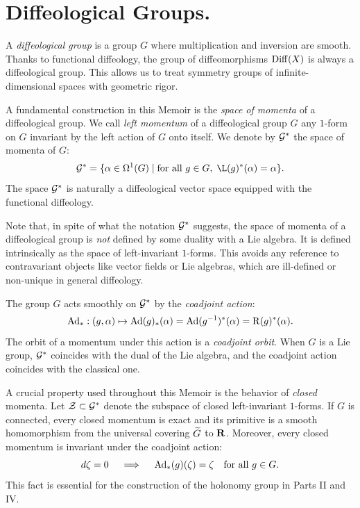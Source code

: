   \section{Diffeological Groups.}
  \label{sec:Diffeological Groups}
  
  A \emph{diffeological group} is a group $G$ where multiplication and inversion are smooth.
  Thanks to functional diffeology,
  the group of diffeomorphisms $\operatorname{Diff}(X)$ is always a diffeological group.
  This allows us to treat symmetry groups of infinite-dimensional spaces with geometric rigor.
  
  \begin{article}
    \label{subsec:Momenta}
    A fundamental construction in this Memoir is the \emph{space of momenta} of a diffeological group.
    We call \emph{left momentum} of a diffeological group $G$ any $1$-form on $G$ invariant by the left action of $G$ onto itself.
    We denote by $\mathcal{G}^*$ the space of momenta of $G$:
    \[
      \cG^* = \{ \alpha \in \DForms^1(G) \mid \text{for all } g \in G, \; \L(g)^*(\alpha) = \alpha \}.
      \]
    The space $\mathcal{G}^*$ is naturally a diffeological vector space equipped with the functional diffeology.
    
    Note that,
    in spite of what the notation $\mathcal{G}^*$ suggests,
    the space of momenta of a diffeological group is \emph{not} defined by some duality with a Lie algebra.
    It is defined intrinsically as the space of left-invariant $1$-forms.
    This avoids any reference to contravariant objects like vector fields or Lie algebras,
    which are ill-defined or non-unique in general diffeology.
    
    The group $G$ acts smoothly on $\mathcal{G}^*$ by the \emph{coadjoint action}:
    \[
      \mathrm{Ad}_* : (g,\alpha) \mapsto \mathrm{Ad}(g)_*(\alpha) = \mathrm{Ad}(g^{-1})^*(\alpha) = \operatorname{R}(g)^*(\alpha).
      \]
    The orbit of a momentum under this action is a \emph{coadjoint orbit}.
    When $G$ is a Lie group,
    $\mathcal{G}^*$ coincides with the dual of the Lie algebra,
    and the coadjoint action coincides with the classical one.
    
    A crucial property used throughout this Memoir is the behavior of \emph{closed} momenta.
    Let $\mathcal{Z} \subset \mathcal{G}^*$ denote the subspace of closed left-invariant $1$-forms.
    If $G$ is connected,
    every closed momentum is exact and its primitive is a smooth homomorphism from the universal covering $\widetilde{G}$ to ${\mathbf{R}}$.
    Moreover,
    every closed momentum is invariant under the coadjoint action:
    \[
      d\zeta = 0 \quad\implies\quad \mathrm{Ad}_*(g)(\zeta) = \zeta \quad \text{for all } g \in G.
      \]
    This fact is essential for the construction of the holonomy group in Parts II and IV.
  \end{article}
  
